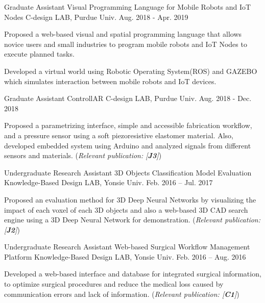 \begin{cventries}

\cventry
{Graduate Assistant} %
{Visual Programming Language for Mobile Robots and IoT Nodes} %
{C-design LAB, Purdue Univ.} %
{Aug. 2018 - Apr. 2019} %
{ %
\begin{cvitems}
\item {Proposed a web-based visual and spatial programming language that allows novice users and small industries to program mobile robots and IoT Nodes to execute planned tasks.}
\item {Developed a virtual world using Robotic Operating System(ROS) and GAZEBO which simulates interaction between mobile robots and IoT devices.}
\end{cvitems} 
}


\cventry
{Graduate Assistant} %
{ControllAR} %
{C-design LAB, Purdue Univ.} %
{Aug. 2018 - Dec. 2018} %
{ %
\begin{cvitems}
\item {Proposed a parametrizing interface, simple and accessible fabrication workflow, and a pressure sensor using a soft piezoresistive elastomer material. Also, developed embedded system using Arduino and analyzed signals from different sensors and materials. (\textit{Relevant publication: [\textbf{J3}]})}
\end{cvitems}
}


\cventry
{Undergraduate Research Assistant} %
{3D Objects Classification Model Evaluation} %
{Knowledge-Based Design LAB, Yonsie Univ.} %
{Feb. 2016 – Jul. 2017} %
{ %
\begin{cvitems}
\item {Proposed an evaluation method for 3D Deep Neural Networks by visualizing the impact of each voxel of each 3D objects and also a web-based 3D CAD search engine using a 3D Deep Neural Network for demonstration. (\textit{Relevant publication: [\textbf{J2}]})}
\end{cvitems}
}

\cventry
{Undergraduate Research Assistant} %
{Web-based Surgical Workflow Management Platform} %
{Knowledge-Based Design LAB, Yonsie Univ.} %
{Feb. 2016 – Aug. 2016} %
{ %
\begin{cvitems}
\item {Developed a web-based interface and database for integrated surgical information, to optimize surgical procedures and reduce the medical loss caused by communication errors and lack of information. (\textit{Relevant publication: [\textbf{C1}]})}
\end{cvitems}
}

\end{cventries}